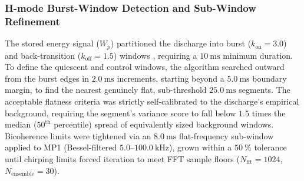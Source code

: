 \subsubsection{H-mode Burst-Window Detection and Sub-Window Refinement}
The stored energy signal ($W_p$) partitioned the discharge into burst ($k_{\mathrm{on}} = 3.0$) and back-transition ($k_{\mathrm{off}} = 1.5$) windows \cite{Kin2025}, requiring a $10~\mathrm{ms}$ minimum duration. To define the quiescent and control windows, the algorithm searched outward from the burst edges in $2.0~\mathrm{ms}$ increments, starting beyond a $5.0~\mathrm{ms}$ boundary margin, to find the nearest genuinely flat, sub-threshold $25.0~\mathrm{ms}$ segments. The acceptable flatness criteria was strictly self-calibrated to the discharge's empirical background, requiring the segment's variance score to fall below $1.5$ times the median ($50^{\mathrm{th}}$ percentile) spread of equivalently sized background windows.
Bicoherence limits were tightened via an $8.0~\mathrm{ms}$ flat-frequency sub-window applied to MP1 (Bessel-filtered $5.0\text{--}100.0~\mathrm{kHz}$), grown within a $50~\%$ tolerance until chirping limits forced iteration to meet FFT sample floors ($N_{\mathrm{fft}} = 1024$, $N_{\mathrm{ensemble}} = 30$).

